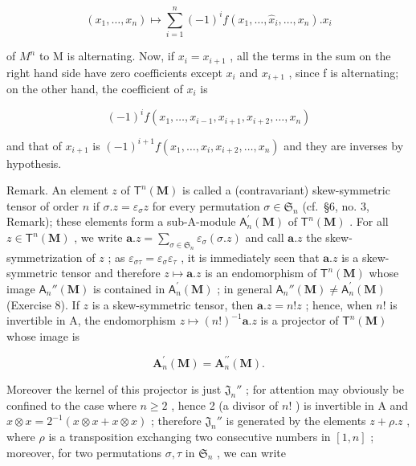 \[
(x _ {1}, \dots , x _ {n}) \mapsto \sum_ {i = 1} ^ {n} (- 1) ^ {i} f (x _ {1}, \dots , \hat {x} _ {i}, \dots , x _ {n}). x _ {i}
\]

of \(M^{n}\) to M is alternating. Now, if \(x_{i} = x_{i+1}\) , all the terms in the sum on the right hand side have zero coefficients except \(x_{i}\) and \(x_{i+1}\) , since f is alternating; on the other hand, the coefficient of \(x_{i}\) is

\[
(- 1) ^ {i} f (x _ {1}, \dots , x _ {i - 1}, x _ {i + 1}, x _ {i + 2}, \dots , x _ {n})
\]

and that of \(x_{i+1}\) is \((-1)^{i+1}f(x_1, \ldots, x_i, x_{i+2}, \ldots, x_n)\) and they are inverses by hypothesis.

Remark. An element \(z\) of \(\mathsf{T}^n (\mathbf{M})\) is called a (contravariant) skew-symmetric tensor of order \(n\) if \(\sigma .z = \varepsilon_{\sigma}z\) for every permutation \(\sigma \in \mathfrak{S}_n\) (cf.~§6, no. 3, Remark); these elements form a sub-A-module \(\mathsf{A}_n^\prime (\mathbf{M})\) of \(\mathsf{T}^n (\mathbf{M})\) . For all \(z\in \mathsf{T}^n (\mathbf{M})\) , we write \(\pmb {a}.z = \sum_{\sigma \in \mathfrak{S}_n}\varepsilon_\sigma (\sigma .z)\) and call \(\pmb {a}.z\) the skew-symmetrization of \(z\) ; as \(\varepsilon_{\sigma \tau} = \varepsilon_{\sigma}\varepsilon_{\tau}\) , it is immediately seen that \(\pmb {a}.z\) is a skew-symmetric tensor and therefore \(z\mapsto \pmb {a}.z\) is an endomorphism of \(\mathsf{T}^n (\mathbf{M})\) whose image \(\mathsf{A}_n''(\mathbf{M})\) is contained in \(\mathsf{A}_n^\prime (\mathbf{M})\) ; in general \(\mathsf{A}_n''(\mathbf{M})\neq \mathsf{A}_n^\prime (\mathbf{M})\) (Exercise 8). If \(z\) is a skew-symmetric tensor, then \(\pmb {a}.z = n!z\) ; hence, when \(n!\) is invertible in A, the endomorphism \(z\mapsto (n!)^{-1}\pmb {a}.z\) is a projector of \(\mathsf{T}^n (\mathbf{M})\) whose image is

\[
\mathbf {A} _ {n} ^ {\prime} (\mathbf {M}) = \mathbf {A} _ {n} ^ {\prime \prime} (\mathbf {M}).
\]

Moreover the kernel of this projector is just \(\mathfrak{J}_n''\) ; for attention may obviously be confined to the case where \(n \geqslant 2\) , hence 2 (a divisor of \(n!\) ) is invertible in A and \(x \otimes x = 2^{-1}(x \otimes x + x \otimes x)\) ; therefore \(\mathfrak{J}_n''\) is generated by the elements \(z + \rho . z\) , where \(\rho\) is a transposition exchanging two consecutive numbers in \([1, n]\) ; moreover, for two permutations \(\sigma, \tau\) in \(\mathfrak{S}_n\) , we can write


